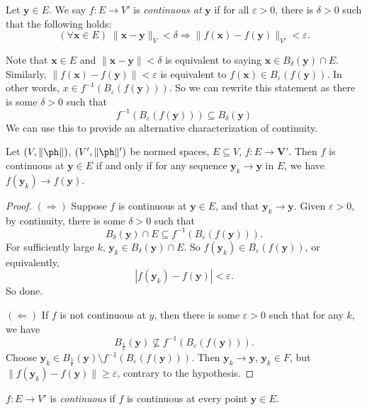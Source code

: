 \documentclass[a4paper]{article}
\begin{document}
\begin{defi}
  Let $\mathbf{y} \in E$. We say $f: E \to V'$ is \emph{continuous at} $\mathbf{y}$ if for all $\varepsilon > 0$, there is $\delta > 0$ such that the following holds:
  \[
    (\forall \mathbf{x} \in E)\; \|\mathbf{x} - \mathbf{y}\|_V < \delta \Rightarrow \|f(\mathbf{x}) - f(\mathbf{y})\|_{V'} < \varepsilon.
  \]
\end{defi}
Note that $\mathbf{x} \in E$ and $\|\mathbf{x} - \mathbf{y}\| < \delta$ is equivalent to saying $\mathbf{x} \in B_\delta(\mathbf{y}) \cap E$. Similarly, $\|f(\mathbf{x}) - f(\mathbf{y})\| < \varepsilon$ is equivalent to $f(\mathbf{x}) \in B_\varepsilon(f(\mathbf{y}))$. In other words, $x \in f^{-1}(B_\varepsilon(f(\mathbf{y})))$.  So we can rewrite this statement as there is some $\delta > 0$ such that
\[
  f^{-1}(B_\varepsilon(f(\mathbf{y}))) \subseteq B_\delta(\mathbf{y})
\]
We can use this to provide an alternative characterization of continuity.
\begin{thm}
  Let $(V, \|\ph\|)$, $(V', \|\ph\|')$ be normed spaces, $E\subseteq V$, $f: E \to \mathbf{V}'$. Then $f$ is continuous at $\mathbf{y} \in E$ if and only if for any sequence $\mathbf{y}_k \to \mathbf{y}$ in $E$, we have $f(\mathbf{y}_k) \to f(\mathbf{y})$.
\end{thm}

\begin{proof}
  $(\Rightarrow)$ Suppose $f$ is continuous at $\mathbf{y} \in E$, and that $\mathbf{y}_k \to \mathbf{y}$. Given $\varepsilon > 0$, by continuity, there is some $\delta > 0$ such that
  \[
    B_\delta(\mathbf{y}) \cap E \subseteq f^{-1}(B_\varepsilon(f(\mathbf{y}))).
  \]
  For sufficiently large $k$, $\mathbf{y}_k \in B_\delta(\mathbf{y}) \cap E$. So $f(\mathbf{y}_k) \in B_\varepsilon(f(\mathbf{y}))$, or equivalently,
  \[
    |f(\mathbf{y}_k) - f(\mathbf{y})| < \varepsilon.
  \]
  So done.

  $(\Leftarrow)$ If $f$ is not continuous at $y$, then there is some $\varepsilon > 0$ such that for any $k$, we have
  \[
    B_{\frac{1}{k}}(\mathbf{y}) \not\subseteq f^{-1}(B_\varepsilon(f(\mathbf{y}))).
  \]
  Choose $\mathbf{y}_k \in B_{\frac{1}{k}}(\mathbf{y}) \setminus f^{-1}(B_{\varepsilon}(f(\mathbf{y})))$. Then $\mathbf{y}_k \to \mathbf{y}$, $\mathbf{y}_k \in F$, but $\|f(\mathbf{y}_k) - f(\mathbf{y})\| \geq \varepsilon$, contrary to the hypothesis.
\end{proof}

\begin{defi}
  $f: E \to V'$ is \emph{continuous} if $f$ is continuous at every point $\mathbf{y} \in E$.
\end{defi}
\end{document}
